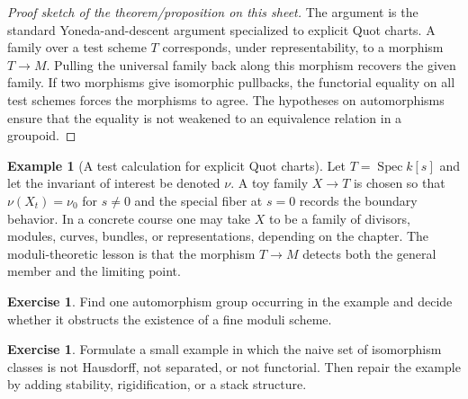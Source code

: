 \documentclass[11pt]{amsart}
\theoremstyle{definition}
\newtheorem{example}[theorem]{Example}
\newtheorem{exercise}[theorem]{Exercise}
\newcommand{\Spec}{\operatorname{Spec}}
\begin{document}
\begin{proof}[Proof sketch of the theorem/proposition on this sheet]
The argument is the standard Yoneda-and-descent argument specialized to explicit Quot charts.  A family over a test scheme $T$ corresponds, under representability, to a morphism $T\to M$.  Pulling the universal family back along this morphism recovers the given family.  If two morphisms give isomorphic pullbacks, the functorial equality on all test schemes forces the morphisms to agree.  The hypotheses on automorphisms ensure that the equality is not weakened to an equivalence relation in a groupoid.
\end{proof}
\begin{example}[A test calculation for explicit Quot charts]
Let $T=\Spec k[s]$ and let the invariant of interest be denoted $\nu$.  A toy family $X\to T$ is chosen so that $\nu(X_t)=\nu_0$ for $s\ne0$ and the special fiber at $s=0$ records the boundary behavior.  In a concrete course one may take $X$ to be a family of divisors, modules, curves, bundles, or representations, depending on the chapter.  The moduli-theoretic lesson is that the morphism $T\to M$ detects both the general member and the limiting point.
\end{example}
\begin{exercise}
Find one automorphism group occurring in the example and decide whether it obstructs the existence of a fine moduli scheme.
\end{exercise}
\begin{exercise}
Formulate a small example in which the naive set of isomorphism classes is not Hausdorff, not separated, or not functorial.  Then repair the example by adding stability, rigidification, or a stack structure.
\end{exercise}
\clearpage
\end{document}
